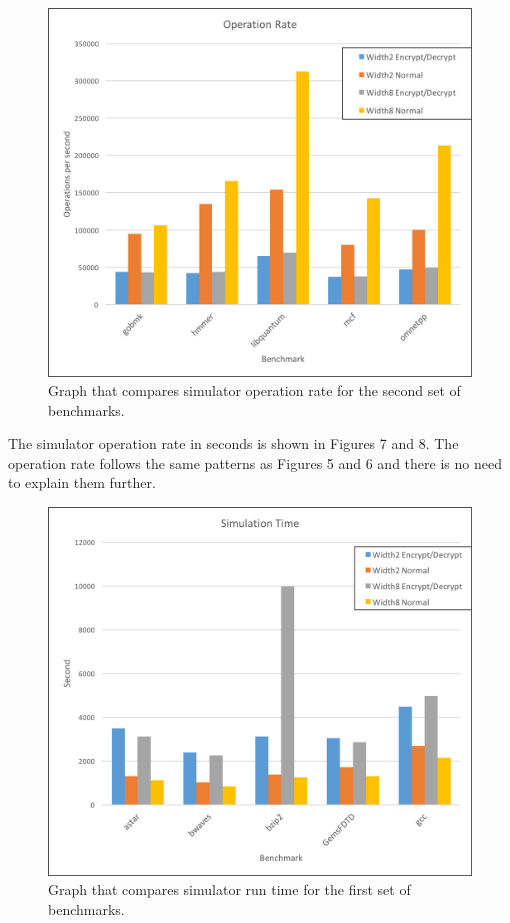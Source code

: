 \documentclass[letterpaper, 10pt, conference]{ieeeconf}  %
\begin{document}
\begin{figure}[thpb]
	\centering
	\includegraphics[scale=.45]{OperationsRate2}
   \caption{Graph that compares simulator operation rate for the second set of benchmarks.}
\end{figure}

The simulator operation rate in seconds is shown in Figures 7 and 8.  The operation rate follows the same patterns as Figures 5 and 6 and there is no need to explain them further.

\begin{figure}[thpb]
	\centering
	\includegraphics[scale=.45]{SimulationTime1}
   \caption{Graph that compares simulator run time for the first set of benchmarks.}
\end{figure}
\end{document}
